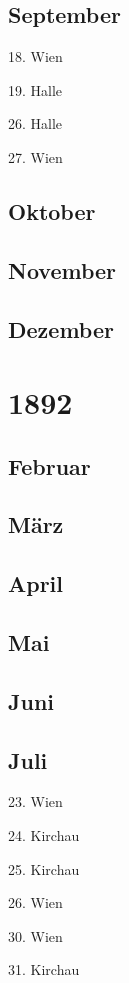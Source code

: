 \documentclass[twoside=false,titlepage=false,open=any, parskip=never, fontsize=10pt, headings=small, chapterprefix=false, appendixprefix=false, DIV=15]{scrbook}
\begin{document}
\begin{multicols}{3}
            \section*{September}
            18. Wien\par
            19. Halle\par
            26. Halle\par
            27. Wien\par
            \section*{Oktober}
            \section*{November}
            \section*{Dezember}
            \chapter*{1892}
            \section*{Februar}
            \section*{März}
            \section*{April}
            \section*{Mai}
            \section*{Juni}
            \section*{Juli}
            23. Wien\par
            24. Kirchau\par
            25. Kirchau\par
            26. Wien\par
            30. Wien\par
            31. Kirchau\par

\end{multicols}
\end{document}
